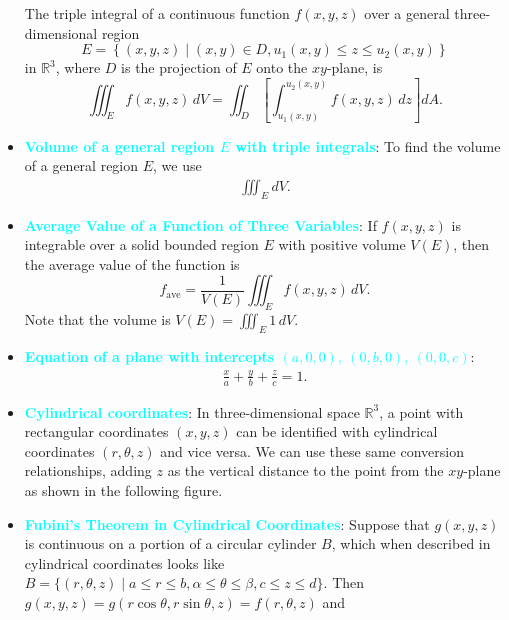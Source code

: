 \documentclass{report}
\begin{document}
\begin{itemize}
            The triple integral of a continuous function $f(x,y,z)$ over a general three-dimensional region
            \[
                E = \left\{ (x,y,z) \mid (x,y) \in D, u_1(x,y) \leq z \leq u_2(x,y) \right\}
            \]
            in $\mathbb{R}^3$, where $D$ is the projection of $E$ onto the $xy$-plane, is
            \[
                \iiint_E f(x,y,z) \, dV = \iint_D \left[ \int_{u_1(x,y)}^{u_2(x,y)} f(x,y,z) \, dz \right] dA.
            \]
        \item \textbf{\textcolor{cyan}{Volume of a general region $E$ with triple integrals}}: To find the volume of a general  region $E$, we use
            \begin{align*}
                \iiint_E dV
            .\end{align*}
        \item \textbf{\textcolor{cyan}{Average Value of a Function of Three Variables}}:
            If $f(x,y,z)$ is integrable over a solid bounded region $E$ with positive volume $V(E)$, then the average value of the function is
            \[
                f_{\text{ave}} = \frac{1}{V(E)} \iiint_E f(x,y,z) \, dV.
            \]
            Note that the volume is $V(E) = \iiint_E 1 \, dV$.
        \item \textbf{\textcolor{cyan}{Equation of a plane with intercepts $(a,0,0),\ (0,b,0),\ (0,0,c) $}}:
            \begin{align*}
                \frac{x}{a} + \frac{y}{b} + \frac{z}{c} = 1
            .\end{align*}
        \item \textbf{\textcolor{cyan}{Cylindrical coordinates}}:
            In three-dimensional space \(\mathbb{R}^3\), a point with rectangular coordinates \((x,y,z)\) can be identified with cylindrical coordinates \((r,\theta,z)\) and vice versa. We can use these same conversion relationships, adding \(z\) as the vertical distance to the point from the \(xy\)-plane as shown in the following figure.
            \bigbreak \noindent 
        \item \textbf{\textcolor{cyan}{Fubini’s Theorem in Cylindrical Coordinates}}:
            Suppose that \(g(x,y,z)\) is continuous on a portion of a circular cylinder \(B\), which when described in cylindrical coordinates looks like \(B = \{(r,\theta,z) \mid a \leq r \leq b, \alpha \leq \theta \leq \beta, c \leq z \leq d\}\).
            \bigbreak \noindent 
            Then \(g(x,y,z) = g(r \cos \theta, r \sin \theta, z) = f(r, \theta, z)\) and

\end{itemize}
\end{document}
